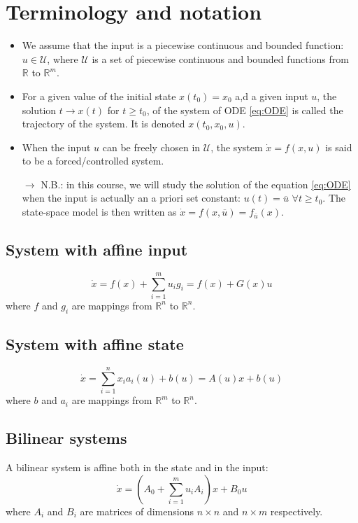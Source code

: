 \documentclass[12pt, openany]{report}
\theoremstyle{definition}
\newcommand{\R}{\mathbb{R}}
\begin{document}
\section{Terminology and notation}
\begin{itemize}
    \item We assume that the input is a piecewise continuous and bounded function: \(u\in \mathcal{U}\), where \(\mathcal{U}\) is a set of piecewise continuous and bounded functions from \(\R\) to \(\R^m\).
    \item For a given value of the initial state \(x(t_0)=x_0\) a,d a given input \(u\), the solution \(t\rightarrow x(t)\) for \(t\ge t_0\), of the system of ODE \ref{eq:ODE} is called the trajectory of the system. It is denoted \(x(t_0,x_0,u)\).
    \item When the input \(u\) can be freely chosen in \(\mathcal{U}\), the system \(\dot x = f(x,u)\) is said to be a forced/controlled system. 
    \item [\(\rightarrow\)] N.B.: in this course, we will study the solution of the equation \ref{eq:ODE} when the input is actually an a priori set constant: \(u(t) = \overline{u}\) \(\forall t\ge t_0\). The state-space model is then written as \(\dot x = f(x,\overline{u}) = f_{\overline{u}}(x)\).
\end{itemize}
\subsection{System with affine input}
\begin{equation}
    \dot x = f(x) + \sum_{i=1}^m u_ig_i = f(x) + G(x)u
\end{equation}
where \(f\) and \(g_i\) are mappings from \(\R^n\) to \(\R^n\). 
\subsection{System with affine state}
\begin{equation}
    \dot x = \sum_{i=1}^n x_ia_i(u) + b(u) = A(u)x+b(u)
\end{equation}
where \(b\) and \(a_i\) are mappings from \(\R^m\) to \(\R^n\). 
\subsection{Bilinear systems}
A bilinear system is affine both in the state and in the input:
\begin{equation}
    \dot x = \left(A_0 + \sum_{i=1}^mu_iA_i\right) x + B_0u 
\end{equation}
where \(A_i\) and \(B_i\) are matrices of dimensions \(n\times n\) and \(n\times m\) respectively. 
\end{document}
